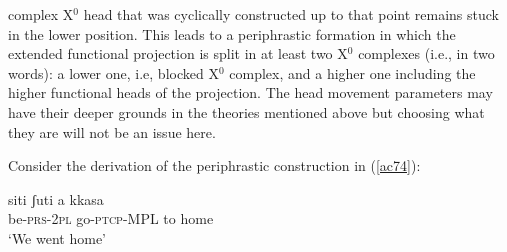 \documentclass[output=paper]{langscibook}
\begin{document}
complex X$^0$ head that was cyclically constructed up to that point remains stuck in the lower position. This leads to a periphrastic formation in which the extended functional projection is split in at least two X$^0$ complexes (i.e., in two words): a lower one, i.e, blocked X$^0$ complex, and a higher one including the higher functional heads of the projection. The head movement parameters may have their deeper grounds in the theories mentioned above but choosing what they are will not be an issue here.
 
Consider the derivation of the periphrastic construction in (\ref{ac74}):

\ea \label{ac74}\gll siti    ʃuti        a   kkasa\\
   be-\textsc{prs}-\textsc{2pl}  go-\textsc{ptcp}-MPL  to  home\\
   \glt ‘We went home’
\z
\end{document}
